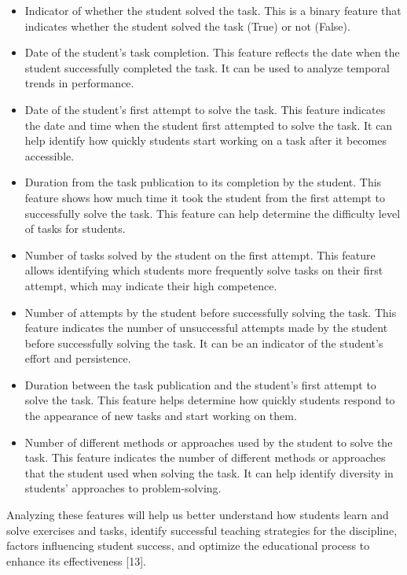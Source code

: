\documentclass[letterpaper]{article}
\begin{document}
\begin{multicols}{2}
\begin{justify}
      \begin{itemize}
        \item	Indicator of whether the student solved the task. This is a binary feature that indicates whether the student solved the task (True) or not (False).
        \item	Date of the student's task completion. This feature reflects the date when the student successfully completed the task. It can be used to analyze temporal trends in performance.
        \item	Date of the student's first attempt to solve the task. This feature indicates the date and time when the student first attempted to solve the task. It can help identify how quickly students start working on a task after it becomes accessible.
        \item	Duration from the task publication to its completion by the student. This feature shows how much time it took the student from the first attempt to successfully solve the task. This feature can help determine the difficulty level of tasks for students.
        \item	Number of tasks solved by the student on the first attempt. This feature allows identifying which students more frequently solve tasks on their first attempt, which may indicate their high competence.
        \item	Number of attempts by the student before successfully solving the task. This feature indicates the number of unsuccessful attempts made by the student before successfully solving the task. It can be an indicator of the student's effort and persistence.
        \item	Duration between the task publication and the student's first attempt to solve the task. This feature helps determine how quickly students respond to the appearance of new tasks and start working on them.
        \item	Number of different methods or approaches used by the student to solve the task. This feature indicates the number of different methods or approaches that the student used when solving the task. It can help identify diversity in students' approaches to problem-solving. 
      \end{itemize}

      Analyzing these features will help us better understand how students learn and solve exercises and tasks, identify successful teaching strategies for the discipline, factors influencing student success, and optimize the educational process to enhance its effectiveness [13].


\end{justify}
\end{multicols}
\end{document}
